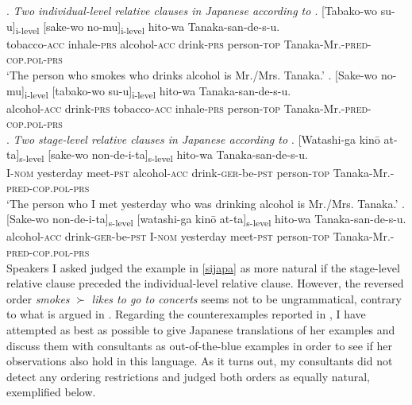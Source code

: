 \documentclass [output=book,colorlinks,citecolor=brown]{langscibook}
\begin{document}

\ex. \emph{Two individual-level relative clauses in Japanese according to \citet[102]{larson:2004:order}}
\ag. [Tabako-wo su-u]\textsubscript{i-level} [sake-wo no-mu]\textsubscript{i-level} hito-wa Tanaka-san-de-s-u.\\
tobacco-\textsc{acc} inhale-\textsc{prs} alcohol-\textsc{acc} drink-\textsc{prs} person-\textsc{top} Tanaka-Mr.-\textsc{pred-cop.pol-prs}\\
`The person who smokes who drinks alcohol is Mr./Mrs. Tanaka.'
\bg. [Sake-wo no-mu]\textsubscript{i-level} [tabako-wo su-u]\textsubscript{i-level} hito-wa Tanaka-san-de-s-u.\\
alcohol-\textsc{acc} drink-\textsc{prs} tobacco-\textsc{acc} inhale-\textsc{prs} person-\textsc{top} Tanaka-Mr.-\textsc{pred-cop.pol-prs}\\

\ex. \emph{Two stage-level relative clauses in Japanese according to \citet[102]{larson:2004:order}}
\ag. [Watashi-ga kinō at-ta]\textsubscript{s-level} [sake-wo non-de-i-ta]\textsubscript{s-level} hito-wa Tanaka-san-de-s-u.\\
I-\textsc{nom} yesterday meet-\textsc{pst} alcohol-\textsc{acc} drink-\textsc{ger}-be-\textsc{pst} person-\textsc{top} Tanaka-Mr.-\textsc{pred-cop.pol-prs}\\
`The person who I met yesterday who was drinking alcohol is Mr./Mrs. Tanaka.'
\bg. [Sake-wo non-de-i-ta]\textsubscript{s-level} [watashi-ga kinō at-ta]\textsubscript{s-level} hito-wa Tanaka-san-de-s-u.\\
alcohol-\textsc{acc} drink-\textsc{ger}-be-\textsc{pst} I-\textsc{nom} yesterday meet-\textsc{pst} person-\textsc{top} Tanaka-Mr.-\textsc{pred-cop.pol-prs}\\

Speakers I asked judged the example in \ref{sijapa} as more natural if the stage-level relative clause preceded the individual-level relative clause. However, the reversed order \textit{smokes} $\succ$ \textit{likes to go to concerts} seems not to be ungrammatical, contrary to what is argued in \citet{larson:2004:order}. Regarding the counterexamples reported in \citet{kim:2019:syntax}, I have attempted as best as possible to give Japanese translations of her examples and discuss them with consultants as out-of-the-blue examples in order to see if her observations also hold in this language. As it turns out, my consultants did not detect any ordering restrictions and judged both orders as equally natural, exemplified below. %
\end{document}
